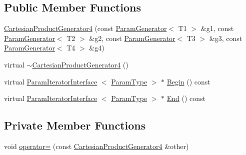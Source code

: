 \subsection*{\-Public \-Member \-Functions}
\begin{DoxyCompactItemize}
\item 
\hyperlink{classtesting_1_1internal_1_1CartesianProductGenerator4_a18dfe26966d973288858a074d83509db}{\-Cartesian\-Product\-Generator4} (const \hyperlink{classtesting_1_1internal_1_1ParamGenerator}{\-Param\-Generator}$<$ \-T1 $>$ \&g1, const \hyperlink{classtesting_1_1internal_1_1ParamGenerator}{\-Param\-Generator}$<$ \-T2 $>$ \&g2, const \hyperlink{classtesting_1_1internal_1_1ParamGenerator}{\-Param\-Generator}$<$ \-T3 $>$ \&g3, const \hyperlink{classtesting_1_1internal_1_1ParamGenerator}{\-Param\-Generator}$<$ \-T4 $>$ \&g4)
\item 
virtual \hyperlink{classtesting_1_1internal_1_1CartesianProductGenerator4_a82d425845d7f11fd319118b3a8f1fdd6}{$\sim$\-Cartesian\-Product\-Generator4} ()
\item 
virtual \hyperlink{classtesting_1_1internal_1_1ParamIteratorInterface}{\-Param\-Iterator\-Interface}\*
$<$ \hyperlink{classtesting_1_1internal_1_1CartesianProductGenerator4_a99c0f82cb1095cf66d28100490e9fa39}{\-Param\-Type} $>$ $\ast$ \hyperlink{classtesting_1_1internal_1_1CartesianProductGenerator4_ab6a1e6ee0c9095fec4ca7dd2fe9736cd}{\-Begin} () const 
\item 
virtual \hyperlink{classtesting_1_1internal_1_1ParamIteratorInterface}{\-Param\-Iterator\-Interface}\*
$<$ \hyperlink{classtesting_1_1internal_1_1CartesianProductGenerator4_a99c0f82cb1095cf66d28100490e9fa39}{\-Param\-Type} $>$ $\ast$ \hyperlink{classtesting_1_1internal_1_1CartesianProductGenerator4_a2175654afa23856e885489861c353c72}{\-End} () const 
\end{DoxyCompactItemize}
\subsection*{\-Private \-Member \-Functions}
\begin{DoxyCompactItemize}
\item 
void \hyperlink{classtesting_1_1internal_1_1CartesianProductGenerator4_a8bbf1458dc9960d616d5d7601120e73a}{operator=} (const \hyperlink{classtesting_1_1internal_1_1CartesianProductGenerator4}{\-Cartesian\-Product\-Generator4} \&other)
\end{DoxyCompactItemize}
